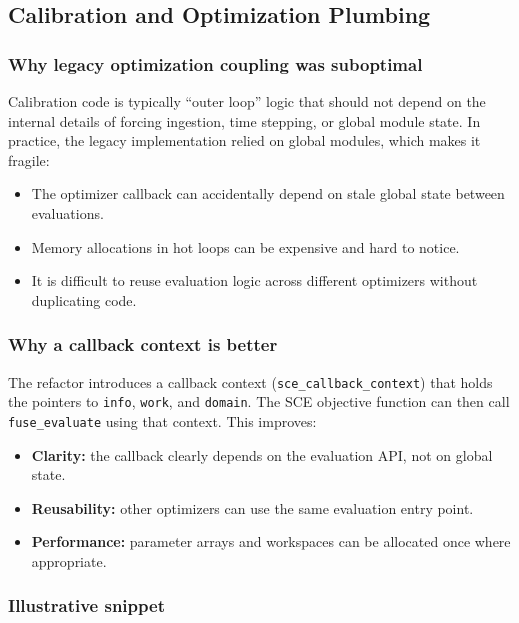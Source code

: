 \documentclass[11pt]{scrartcl}
\begin{document}
\subsection{Calibration and Optimization Plumbing}

\subsubsection{Why legacy optimization coupling was suboptimal}

Calibration code is typically ``outer loop'' logic that should not depend on the internal
details of forcing ingestion, time stepping, or global module state. In practice, the legacy
implementation relied on global modules, which makes it fragile:
\begin{itemize}[leftmargin=*]
\item The optimizer callback can accidentally depend on stale global state between evaluations.
\item Memory allocations in hot loops can be expensive and hard to notice.
\item It is difficult to reuse evaluation logic across different optimizers without duplicating code.
\end{itemize}

\subsubsection{Why a callback context is better}

The refactor introduces a callback context (\texttt{sce\_callback\_context}) that holds the pointers
to \texttt{info}, \texttt{work}, and \texttt{domain}. The SCE objective function can then call
\texttt{fuse\_evaluate} using that context. This improves:

\begin{itemize}[leftmargin=*]
\item \textbf{Clarity:} the callback clearly depends on the evaluation API, not on global state.
\item \textbf{Reusability:} other optimizers can use the same evaluation entry point.
\item \textbf{Performance:} parameter arrays and workspaces can be allocated once where appropriate.
\end{itemize}

\subsubsection{Illustrative snippet}
\end{document}
